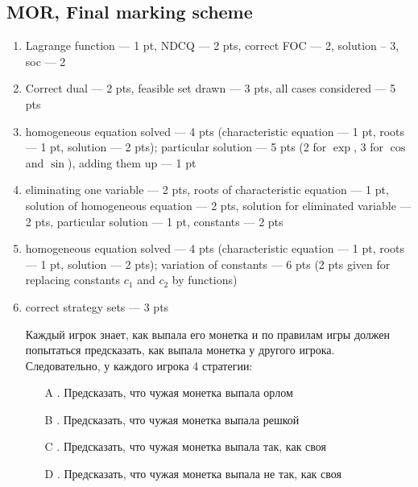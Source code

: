 


\subsection{MOR, Final marking scheme}

\begin{enumerate}
\item Lagrange function --- 1 pt, NDCQ --- 2 pts, correct FOC --- 2, solution -- 3, soc --- 2

\item Correct dual --- 2 pts, feasible set drawn --- 3 pts, all cases considered --- 5 pts

\item homogeneous equation solved --- 4 pts (characteristic equation --- 1 pt, roots --- 1 pt, solution --- 2 pts); particular solution --- 5 pts (2 for $\exp$, 3 for $\cos$ and $\sin$), adding them up --- 1 pt


\item eliminating one variable --- 2 pts, roots of characteristic equation --- 1 pt, solution of homogeneous equation --- 2 pts, solution for eliminated variable --- 2 pts, particular solution --- 1 pt, constants --- 2 pts


\item  homogeneous equation solved --- 4 pts (characteristic equation --- 1 pt, roots --- 1 pt, solution --- 2 pts); variation of constants --- 6 pts (2 pts given for replacing constants $c_1$ and $c_2$ by functions)

\item  correct strategy sets --- 3 pts

Каждый игрок знает, как выпала его монетка и по правилам игры должен попытаться предсказать, как выпала монетка у другого игрока. Следовательно, у каждого игрока 4 стратегии:

\begin{enumerate}
\item[A]. Предсказать, что чужая монетка выпала орлом
\item[B]. Предсказать, что чужая монетка выпала решкой
\item[C]. Предсказать, что чужая монетка выпала так, как своя
\item[D]. Предсказать, что чужая монетка выпала не так, как своя
\end{enumerate}


\end{enumerate}
